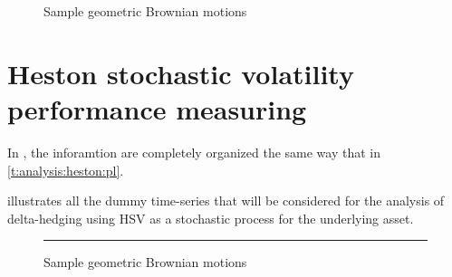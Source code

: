 \documentclass[12pt]{report}
\begin{document}
\begin{figure}[h]
  \centering
  
  \caption{Sample geometric Brownian motions}
  \label{p:analysis:mjd:hedge:deltas}
\end{figure}






\section{Heston stochastic volatility performance measuring}
\label{sec:section name}


In , the inforamtion are completely organized the same way that in \cref{t:analysis:heston:pl}.

 illustrates all the dummy time-series that will be considered for the analysis of delta-hedging using HSV as a stochastic process for the underlying asset.


\begin{figure}[ht]
  \centering
  \rule{40mm}{20mm}
  \caption{Sample geometric Brownian motions}
  \label{p:analysis:mjd:100}
\end{figure}
\end{document}
